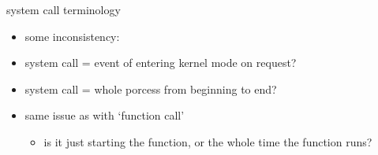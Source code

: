 \begin{frame}{system call terminology}
    \begin{itemize}
    \item some inconsistency:
    \vspace{.5cm}
    \item system call = event of entering kernel mode on request?
    \item system call = whole porcess from beginning to end?
    \vspace{.5cm}
    \item same issue as with `function call'
	\begin{itemize}
	\item is it just starting the function, or the whole time the function runs?
	\end{itemize}
    \end{itemize}
\end{frame}
